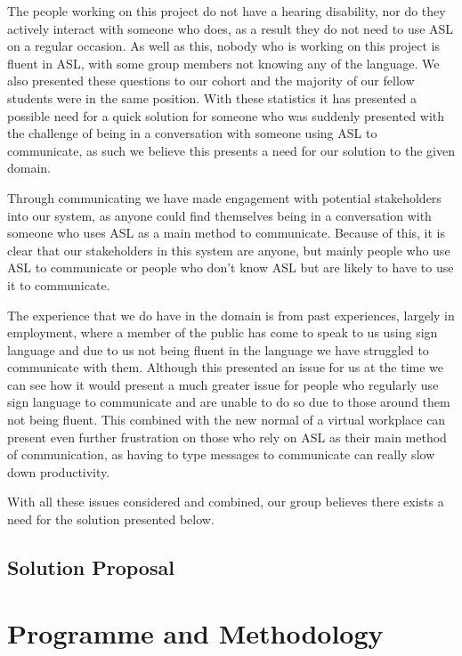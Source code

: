 \documentclass[10pt]{article}
\begin{document}
  The people working on this project do not have a hearing disability, nor do they actively interact 
  with someone who does, as a result they do not need to use ASL on a regular occasion. As well as 
  this, nobody who is working on this project is fluent in ASL, with some group members not knowing 
  any of the language. We also presented these questions to our cohort and the majority of our 
  fellow students were in the same position. With these statistics it has presented a possible need 
  for a quick solution for someone who was suddenly presented with the challenge of being in a 
  conversation with someone using ASL to communicate, as such we believe this presents a need for 
  our solution to the given domain.

  Through communicating we have made engagement with potential stakeholders into our system, as 
  anyone could find themselves being in a conversation with someone who uses ASL as a main method to 
  communicate. Because of this, it is clear that our stakeholders in this system are anyone, but 
  mainly people who use ASL to communicate or people who don't know ASL but are likely to have to 
  use it to communicate.

  The experience that we do have in the domain is from past experiences, largely in employment, 
  where a member of the public has come to speak to us using sign language and due to us not being 
  fluent in the language we have struggled to communicate with them. Although this presented an 
  issue for us at the time we can see how it would present a much greater issue for people who 
  regularly use sign language to communicate and are unable to do so due to those around them not 
  being fluent. This combined with the new normal of a virtual workplace can present even further 
  frustration on those who rely on ASL as their main method of communication, as having to type 
  messages to communicate can really slow down productivity.

  With all these issues considered and combined, our group believes there exists a need for the 
  solution presented below.

  \subsection{Solution Proposal}

\section{Programme and Methodology}
\end{document}
